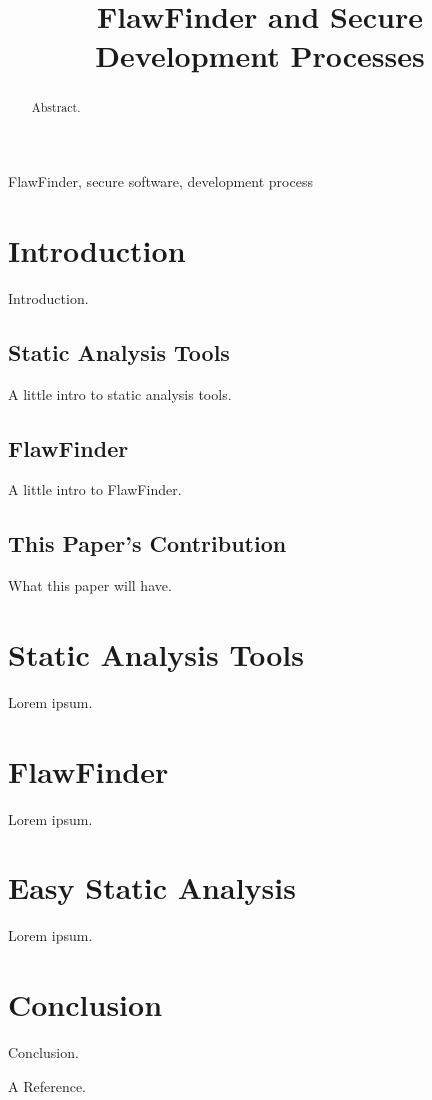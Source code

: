 \documentclass[journal]{IEEEtran}
\begin{document}

\title{FlawFinder and Secure Development Processes}

\author{
}

\maketitle



\begin{abstract}
Abstract.
\end{abstract}

\begin{IEEEkeywords}
FlawFinder, secure software, development process
\end{IEEEkeywords}



\section{Introduction}
Introduction.

\subsection{Static Analysis Tools}
A little intro to static analysis tools.

\subsection{FlawFinder}
A little intro to FlawFinder.

\subsection{This Paper's Contribution}
What this paper will have.


\section{Static Analysis Tools}
Lorem ipsum.


\section{FlawFinder}
Lorem ipsum.


\section{Easy Static Analysis}
Lorem ipsum.


\section{Conclusion}
Conclusion.



\begin{thebibliography}{00}

 A Reference.

\end{thebibliography}
\end{document}
